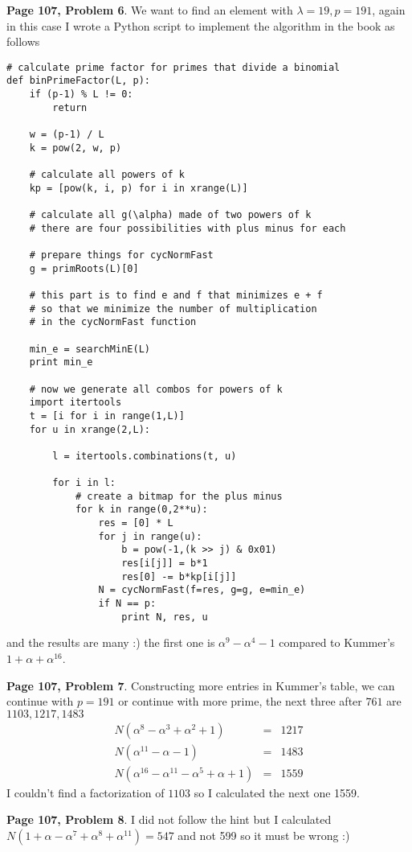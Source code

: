 \documentclass[aps,preprint,preprintnumbers,nofootinbib,showpacs,prd]{revtex4-1}
\newcommand{\nbea}{\begin{eqnarray*}}
\newcommand{\neea}{\end{eqnarray*}}
\begin{document}
{\bf Page 107, Problem 6}. We want to find an element with $\lambda = 19, p = 191$, again in this case I wrote a Python script to implement the algorithm in the book as follows
%
\begin{Verbatim}[baselinestretch=0.75]
# calculate prime factor for primes that divide a binomial
def binPrimeFactor(L, p):
    if (p-1) % L != 0:
        return

    w = (p-1) / L
    k = pow(2, w, p)

    # calculate all powers of k
    kp = [pow(k, i, p) for i in xrange(L)]

    # calculate all g(\alpha) made of two powers of k
    # there are four possibilities with plus minus for each

    # prepare things for cycNormFast
    g = primRoots(L)[0]

    # this part is to find e and f that minimizes e + f
    # so that we minimize the number of multiplication
    # in the cycNormFast function
    
    min_e = searchMinE(L)
    print min_e

    # now we generate all combos for powers of k
    import itertools
    t = [i for i in range(1,L)]
    for u in xrange(2,L):
        
        l = itertools.combinations(t, u)

        for i in l:
            # create a bitmap for the plus minus
            for k in range(0,2**u):
                res = [0] * L
                for j in range(u):
                    b = pow(-1,(k >> j) & 0x01)
                    res[i[j]] = b*1
                    res[0] -= b*kp[i[j]]
                N = cycNormFast(f=res, g=g, e=min_e)
                if N == p:
                    print N, res, u
\end{Verbatim}
%
and the results are many :) the first one is $\alpha^9 - \alpha^4 - 1$ compared to Kummer's $1 + \alpha + \alpha^{16}$.

{\bf Page 107, Problem 7}. Constructing more entries in Kummer's table, we can continue with $p = 191$ or continue with more prime, the next three after $761$ are $1103, 1217, 1483$
%
\nbea
N(\alpha^8 - \alpha^3 + \alpha^2 + 1) & = & 1217 \\
N(\alpha^{11} - \alpha - 1) & = & 1483 \\
N(\alpha^{16} - \alpha^{11} - \alpha^5 + \alpha + 1) & = & 1559
\neea
%
I couldn't find a factorization of $1103$ so I calculated the next one 1559.

{\bf Page 107, Problem 8}. I did not follow the hint but I calculated $N(1 + \alpha - \alpha^7 + \alpha^8 + \alpha^{11}) = 547$ and not 599 so it must be wrong :)
\end{document}
